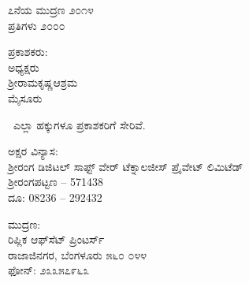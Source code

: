 \thispagestyle{empty}
\begin{flushleft}
{\fontsize{10}{12.5}\selectfont
೭ನೆಯ ಮುದ್ರಣ ೨೦೧೪‍\\
ಪ್ರತಿಗಳು ೨೦೦೦
\vfill

ಪ್ರಕಾಶಕರು:\\
ಅಧ್ಯಕ್ಷರು\\
ಶ್ರೀರಾಮಕೃಷ್ಣಆಶ್ರಮ\\
ಮೈಸೂರು
\vfill

\eng{\copyright}\ ಎಲ್ಲಾ ಹಕ್ಕುಗಳೂ ಪ್ರಕಾಶಕರಿಗೆ ಸೇರಿವೆ.
\vfill

ಅಕ್ಷರ ವಿನ್ಯಾಸ:\\ಶ‍್ರೀರಂಗ ಡಿಜಿಟಲ್ ಸಾಫ್ಟ್ ‍ವೇರ್ ಟೆಕ್ನಾಲಜೀಸ್ ಪ್ರೈವೇಟ್ ಲಿಮಿಟೆಡ್\\ಶ‍್ರೀರಂಗಪಟ್ಟಣ – 571438\\ದೂ: 08236 – 292432
\vfill

ಮುದ್ರಣ:\\
ರಿಪ್ಲಿಕ ಆಫ್​ಸೆಟ್ ಪ್ರಿಂಟರ್ಸ್\\
ರಾಜಾಜಿನಗರ, ಬೆಂಗಳೂರು ೫೬೦ ೦೪೪\\
ಫೋನ್: ೨೩೩೫೭೯೬೩
}
\end{flushleft}

